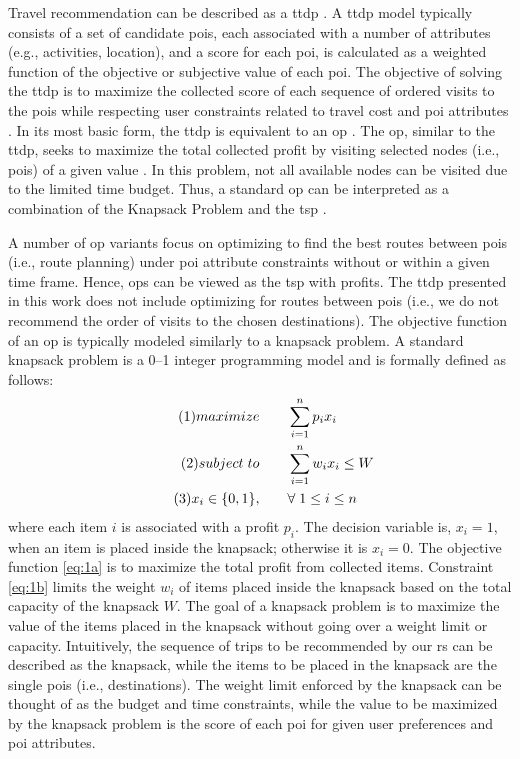 Travel recommendation can be described as a \gls{ttdp} \parencite{Vansteenwegen2007TheOpportunity}. A \gls{ttdp} model typically consists of a set of candidate \glspl{poi}, each associated with a number of attributes (e.g., activities, location), and a score for each \gls{poi}, is calculated as a weighted function of the objective or subjective value of each \gls{poi}. The objective of solving the \gls{ttdp} is to maximize the collected score of each sequence of ordered visits to the \glspl{poi} while respecting user constraints related to travel cost and \gls{poi} attributes \parencite{Survey_TTDP_Guavalas}. In its most basic form, the \gls{ttdp} is equivalent to an \gls{op} \parencite{Vansteenwegen2007TheOpportunity}. The \gls{op}, similar to the \gls{ttdp}, seeks to maximize the total collected profit by visiting selected nodes (i.e., \glspl{poi}) of a given value \parencite{T.1984HeuristicOrienteering}. In this problem, not all available nodes can be visited due to the limited time budget. Thus, a standard \gls{op} can be interpreted as a combination of the Knapsack Problem and the \gls{tsp} \parencite{OP_Solution_Gunawan}. 

A number of \gls{op} variants focus on optimizing to find the best routes between \glspl{poi} (i.e., route planning) under \gls{poi} attribute constraints without or within a given time frame. Hence, \glspl{op} can be viewed as the \gls{tsp} with profits. The \gls{ttdp} presented in this work does not include optimizing for routes between \glspl{poi} (i.e., we do not recommend the order of visits to the chosen destinations). The objective function of an \gls{op} is typically modeled similarly to a knapsack problem. A standard knapsack problem is a 0–1 integer programming model and is formally defined as follows:
\begin{align}\tag{1}
    maximize \qquad &\sum_{i=1}^n p_ix_i\label{eq:1a}\\
   \tag{2} subject \hspace{0.1cm} to \qquad &\sum_{i=1}^n w_ix_i \leq W\label{eq:1b} \\
    \tag{3}x_i \in \{0,1\}, \qquad &\forall \hspace{0.1cm} 1 \leq i \leq n\label{eq:1c}
\end{align}
where each item $i$ is associated with a profit $p_i$. The decision variable is, $x_i = 1$, when an item is placed inside the knapsack; otherwise it is $x_i=0$. The objective function \ref{eq:1a} is to maximize the total profit from collected items. Constraint \ref{eq:1b} limits the weight $w_i$ of items placed inside the knapsack based on the total capacity of the knapsack $W$. The goal of a knapsack problem is to maximize the value of the items placed in the knapsack without going over a weight limit or capacity. Intuitively, the sequence of trips to be recommended by our \gls{rs} can be described as the knapsack, while the items to be placed in the knapsack are the single \glspl{poi} (i.e., destinations). The weight limit enforced by the knapsack can be thought of as the budget and time constraints, while the value to be maximized by the knapsack problem is the score of each \gls{poi} for given user preferences and \gls{poi} attributes.

